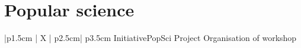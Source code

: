 \section{Popular science}
\begin{mySectionContents}
\iftrue %
\begin{myTableEnv}{|p{1.5cm} | X | p{2.5cm}| p{3.5cm}}
    \myRow
        {\myWhen}{}
        {Initiative}{PopSci Project}
    \myRow
        {\myWhat}{Organisation of workshop}
        {}{}
\end{myTableEnv}

\myTablesSeparator
\fi
\end{mySectionContents}